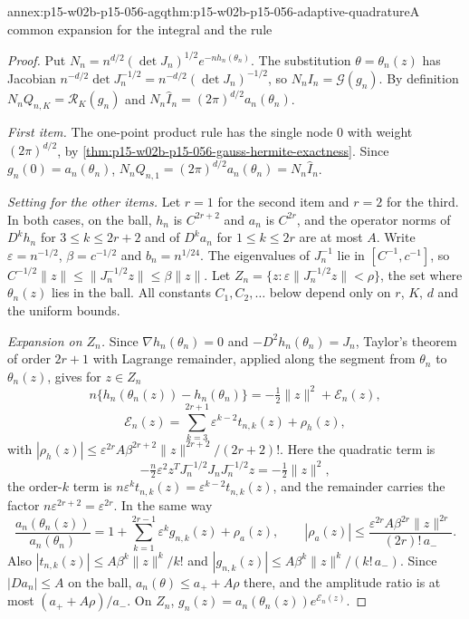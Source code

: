 \begin{annexitem}{annex:p15-w02b-p15-056-agq}{thm:p15-w02b-p15-056-adaptive-quadrature}{A common expansion for the integral and the rule}
\begin{proof}
Put \(N_n=n^{d/2}(\det J_n)^{1/2}e^{-nh_n(\theta_n)}\). The substitution
\(\theta=\theta_n(z)\) has Jacobian
\(n^{-d/2}\det J_n^{-1/2}=n^{-d/2}(\det J_n)^{-1/2}\), so
\(N_nI_n=\mathcal G(g_n)\). By definition \(N_nQ_{n,K}=\mathcal R_K(g_n)\)
and \(N_n\widehat I_n=(2\pi)^{d/2}a_n(\theta_n)\).

\emph{First item.} The one-point product rule has the single node \(0\)
with weight \((2\pi)^{d/2}\), by
\cref{thm:p15-w02b-p15-056-gauss-hermite-exactness}. Since
\(g_n(0)=a_n(\theta_n)\), \(N_nQ_{n,1}=(2\pi)^{d/2}a_n(\theta_n)=N_n\widehat I_n\).

\emph{Setting for the other items.} Let \(r=1\) for the second item and
\(r=2\) for the third. In both cases, on the ball, \(h_n\) is
\(C^{2r+2}\) and \(a_n\) is \(C^{2r}\), and the operator norms of
\(D^kh_n\) for \(3\leq k\leq2r+2\) and of \(D^ka_n\) for
\(1\leq k\leq2r\) are at most \(A\). Write \(\varepsilon=n^{-1/2}\),
\(\beta=c^{-1/2}\) and \(b_n=n^{1/24}\). The eigenvalues of \(J_n^{-1}\)
lie in \([C^{-1},c^{-1}]\), so
\(C^{-1/2}\|z\|\leq\|J_n^{-1/2}z\|\leq\beta\|z\|\). Let
\(Z_n=\{z:\varepsilon\|J_n^{-1/2}z\|<\rho\}\), the set where
\(\theta_n(z)\) lies in the ball. All constants \(C_1,C_2,\ldots\) below
depend only on \(r\), \(K\), \(d\) and the uniform bounds.

\emph{Expansion on \(Z_n\).} Since \(\nabla h_n(\theta_n)=0\) and
\(-D^2h_n(\theta_n)=J_n\), Taylor's theorem of order \(2r+1\) with
Lagrange remainder, applied along the segment from \(\theta_n\) to
\(\theta_n(z)\), gives for \(z\in Z_n\)
\[
 n\{h_n(\theta_n(z))-h_n(\theta_n)\}
 =-\tfrac12\|z\|^2+\mathcal E_n(z),
\]
\[
 \mathcal E_n(z)=\sum_{k=3}^{2r+1}\varepsilon^{k-2}t_{n,k}(z)+\rho_{h}(z),
\]
with \(|\rho_h(z)|\leq\varepsilon^{2r}A\beta^{2r+2}\|z\|^{2r+2}/(2r+2)!\).
Here the quadratic term is
\[
 -\tfrac n2\varepsilon^2z^TJ_n^{-1/2}J_nJ_n^{-1/2}z=-\tfrac12\|z\|^2,
\]
the order-\(k\) term is \(n\varepsilon^kt_{n,k}(z)=\varepsilon^{k-2}t_{n,k}(z)\),
and the remainder carries the factor \(n\varepsilon^{2r+2}=\varepsilon^{2r}\).
In the same way
\[
 \frac{a_n(\theta_n(z))}{a_n(\theta_n)}
 =1+\sum_{k=1}^{2r-1}\varepsilon^kg_{n,k}(z)+\rho_a(z),\qquad
 |\rho_a(z)|\leq\frac{\varepsilon^{2r}A\beta^{2r}\|z\|^{2r}}{(2r)!\,a_-}.
\]
Also \(|t_{n,k}(z)|\leq A\beta^k\|z\|^k/k!\) and
\(|g_{n,k}(z)|\leq A\beta^k\|z\|^k/(k!\,a_-)\). Since
\(|Da_n|\leq A\) on the ball, \(a_n(\theta)\leq a_++A\rho\) there, and the
amplitude ratio is at most \((a_++A\rho)/a_-\). On \(Z_n\),
\(g_n(z)=a_n(\theta_n(z))e^{\mathcal E_n(z)}\).


\end{proof}
\end{annexitem}
